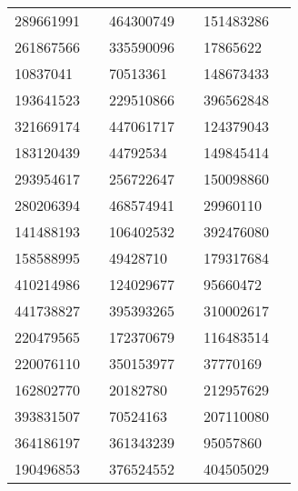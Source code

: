 \begin{longtable}{llllll}
289661991 & \cite{TIC_156648452} & 464300749 & \cite{TIC_464300749} & 151483286 & \cite{TIC_156648452} \\
261867566 & \cite{TIC_261867566} & 335590096 & \cite{TIC_335590096} & 17865622 & \cite{TIC_70524163} \\
10837041 & \cite{TIC_10837041} & 70513361 & \cite{TIC_70513361} & 148673433 & \cite{TIC_428699140} \\
193641523 & \cite{TIC_193641523} & 229510866 & \cite{TIC_376637093} & 396562848 & \cite{TIC_396562848} \\
321669174 & \cite{TIC_126606859} & 447061717 & \cite{TIC_447061717} & 124379043 & \cite{TIC_156648452} \\
183120439 & \cite{TIC_140691463} & 44792534 & \cite{TIC_44792534} & 149845414 & \cite{TIC_219016883} \\
293954617 & \cite{TIC_293954617} & 256722647 & \cite{TIC_348835438} & 150098860 & \cite{TIC_150098860} \\
280206394 & \cite{TIC_280206394} & 468574941 & \cite{TIC_376637093} & 29960110 & \cite{TIC_29960110} \\
141488193 & \cite{TIC_141488193} & 106402532 & \cite{TIC_106402532} & 392476080 & \cite{TIC_392476080} \\
158588995 & \cite{TIC_158588995} & 49428710 & \cite{TIC_219016883} & 179317684 & \cite{TIC_179317684} \\
410214986 & \cite{TIC_410214986} & 124029677 & \cite{TIC_124029677} & 95660472 & \cite{TIC_156648452} \\
441738827 & \cite{TIC_441738827} & 395393265 & \cite{TIC_428787891} & 310002617 & \cite{TIC_156648452} \\
220479565 & \cite{TIC_220479565} & 172370679 & \cite{TIC_172370679} & 116483514 & \cite{TIC_10837041} \\
220076110 & \cite{TIC_156648452} & 350153977 & \cite{TIC_350153977} & 37770169 & \cite{TIC_70513361} \\
162802770 & \cite{TIC_162802770} & 20182780 & \cite{TIC_20182780} & 212957629 & \cite{TIC_212957629} \\
393831507 & \cite{TIC_393831507} & 70524163 & \cite{TIC_70524163} & 207110080 & \cite{TIC_207110080} \\
364186197 & \cite{TIC_364186197} & 361343239 & \cite{TIC_156648452} & 95057860 & \cite{TIC_95057860} \\
190496853 & \cite{TIC_162802770} & 376524552 & \cite{TIC_428787891} & 404505029 & \cite{TIC_404505029} \\

\end{longtable}
